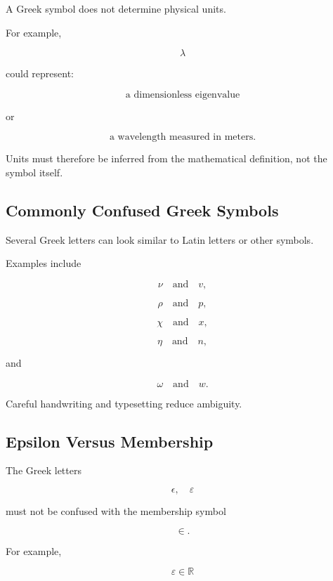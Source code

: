 A Greek symbol does not determine physical units.

For example,

\[
\lambda
\]

could represent:

\[
\boxed{
\text{a dimensionless eigenvalue}
}
\]

or

\[
\boxed{
\text{a wavelength measured in meters}.
}
\]

Units must therefore be inferred from the mathematical definition, not the
symbol itself.

\subsection{Commonly Confused Greek Symbols}
\label{subsec:confused-greek-symbols}

Several Greek letters can look similar to Latin letters or other symbols.

Examples include

\[
\boxed{
\nu
\quad\text{and}\quad
v,
}
\]

\[
\boxed{
\rho
\quad\text{and}\quad
p,
}
\]

\[
\boxed{
\chi
\quad\text{and}\quad
x,
}
\]

\[
\boxed{
\eta
\quad\text{and}\quad
n,
}
\]

and

\[
\boxed{
\omega
\quad\text{and}\quad
w.
}
\]

Careful handwriting and typesetting reduce ambiguity.

\subsection{Epsilon Versus Membership}
\label{subsec:greek-epsilon-versus-membership}

The Greek letters

\[
\boxed{
\epsilon,
\quad
\varepsilon
}
\]

must not be confused with the membership symbol

\[
\boxed{
\in.
}
\]

For example,

\[
\boxed{
\varepsilon\in\mathbb{R}
}
\]

